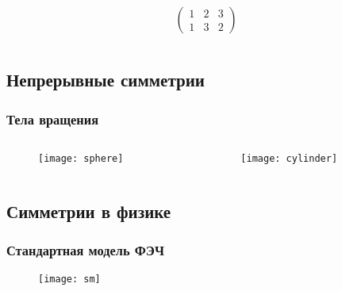 \begin{frame}
\begin{columns}
\begin{column}{0.33\textwidth}
\begin{figure}[H]
            \end{figure}
            \vspace{-0.2cm}
            \begin{equation*}
                \left(\begin{array}{ccc}
                    1 & 2 & 3 \\
                    1 & 3 & 2 
                \end{array}\right)
            \end{equation*}
            \vspace{-0.5cm}
            \begin{figure}[H]
                \begin{centering}
                    
                \end{centering}
            \end{figure}
        \end{column}
    \end{columns}
\end{frame}

\subsection{Непрерывные симметрии}
\begin{frame}
    \frametitle{Тела вращения}
    \begin{columns}
        \begin{column}{0.5\textwidth}
            \begin{figure}
                \begin{centering}
                    \texttt{[image: sphere]}
                \end{centering}
            \end{figure}
        \end{column}
        \begin{column}{0.5\textwidth}
            \begin{figure}
                \begin{centering}
                    \texttt{[image: cylinder]}
                \end{centering}
            \end{figure}
        \end{column}
    \end{columns}
\end{frame}

\subsection{Симметрии в физике}
\begin{frame}
    \frametitle{Стандартная модель ФЭЧ}
    \begin{figure}
        \begin{centering}
            \texttt{[image: sm]}
        \end{centering}
    \end{figure}
\end{frame}
